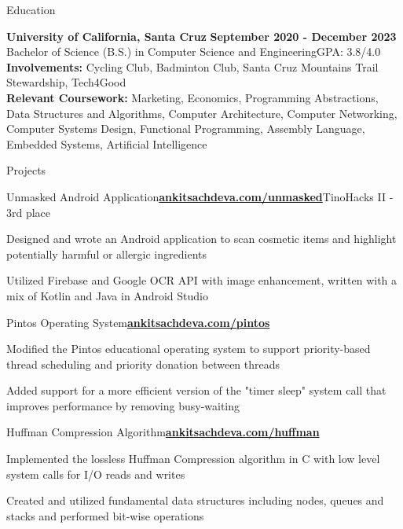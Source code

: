 \documentclass{resume}
\begin{document}
\begin{rSection}{\large Education}

{\bf University of California, Santa Cruz} \hfill {\bf{September 2020 - December 2023}}
\\ Bachelor of Science (B.S.) in Computer Science and Engineering\hfill {GPA: 3.8/4.0}
\\ \textbf{Involvements:}  Cycling Club, Badminton Club, Santa Cruz Mountains Trail Stewardship, Tech4Good
\\ \textbf{Relevant Coursework:} Marketing, Economics, Programming Abstractions, Data Structures and Algorithms, Computer Architecture, Computer Networking, Computer Systems Design, Functional Programming, Assembly Language, Embedded Systems, Artificial Intelligence

\end{rSection}

\begin{rSection}{\large Projects}

\begin{rSubsection}{Unmasked Android Application}{\href{https://ankitsachdeva.com/unmasked}{\bf{{ankitsachdeva.com/unmasked}}}}{TinoHacks II - 3rd place}{}
\item Designed and wrote an Android application to scan cosmetic items and highlight potentially harmful or allergic ingredients
\item Utilized Firebase and Google OCR API with image enhancement, written with a mix of Kotlin and Java in Android Studio
\end{rSubsection}

\begin{rSubsection}{Pintos Operating System}{\href{http://ankitsachdeva.com/pintos/}{\bf{{ankitsachdeva.com/pintos}}}}{}{}
\item Modified the Pintos educational operating system to support priority-based thread scheduling and priority donation between threads
\item Added support for a more efficient version of the "timer sleep" system call that improves performance by removing busy-waiting
\end{rSubsection}

\begin{rSubsection}{Huffman Compression Algorithm}{\href{https://ankitsachdeva.com/huffman/}{\bf{{ankitsachdeva.com/huffman}}}}{}{}
\item Implemented the lossless Huffman Compression algorithm in C with low level system calls for I/O reads and writes
\item Created and utilized fundamental data structures including nodes, queues and stacks and performed bit-wise operations
\end{rSubsection}


\end{rSection}
\end{document}
